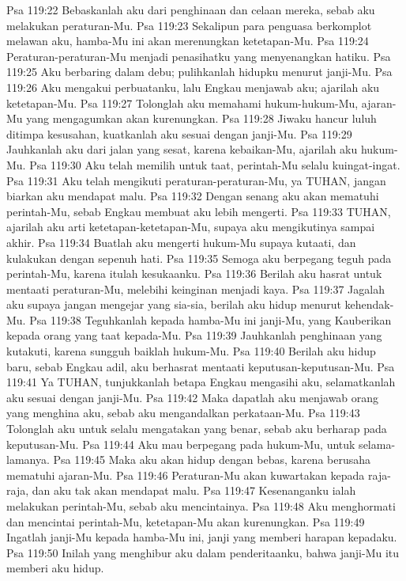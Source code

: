 Psa 119:22  Bebaskanlah aku dari penghinaan dan celaan mereka, sebab aku melakukan peraturan-Mu.
Psa 119:23  Sekalipun para penguasa berkomplot melawan aku, hamba-Mu ini akan merenungkan ketetapan-Mu.
Psa 119:24  Peraturan-peraturan-Mu menjadi penasihatku yang menyenangkan hatiku.
Psa 119:25  Aku berbaring dalam debu; pulihkanlah hidupku menurut janji-Mu.
Psa 119:26  Aku mengakui perbuatanku, lalu Engkau menjawab aku; ajarilah aku ketetapan-Mu.
Psa 119:27  Tolonglah aku memahami hukum-hukum-Mu, ajaran-Mu yang mengagumkan akan kurenungkan.
Psa 119:28  Jiwaku hancur luluh ditimpa kesusahan, kuatkanlah aku sesuai dengan janji-Mu.
Psa 119:29  Jauhkanlah aku dari jalan yang sesat, karena kebaikan-Mu, ajarilah aku hukum-Mu.
Psa 119:30  Aku telah memilih untuk taat, perintah-Mu selalu kuingat-ingat.
Psa 119:31  Aku telah mengikuti peraturan-peraturan-Mu, ya TUHAN, jangan biarkan aku mendapat malu.
Psa 119:32  Dengan senang aku akan mematuhi perintah-Mu, sebab Engkau membuat aku lebih mengerti.
Psa 119:33  TUHAN, ajarilah aku arti ketetapan-ketetapan-Mu, supaya aku mengikutinya sampai akhir.
Psa 119:34  Buatlah aku mengerti hukum-Mu supaya kutaati, dan kulakukan dengan sepenuh hati.
Psa 119:35  Semoga aku berpegang teguh pada perintah-Mu, karena itulah kesukaanku.
Psa 119:36  Berilah aku hasrat untuk mentaati peraturan-Mu, melebihi keinginan menjadi kaya.
Psa 119:37  Jagalah aku supaya jangan mengejar yang sia-sia, berilah aku hidup menurut kehendak-Mu.
Psa 119:38  Teguhkanlah kepada hamba-Mu ini janji-Mu, yang Kauberikan kepada orang yang taat kepada-Mu.
Psa 119:39  Jauhkanlah penghinaan yang kutakuti, karena sungguh baiklah hukum-Mu.
Psa 119:40  Berilah aku hidup baru, sebab Engkau adil, aku berhasrat mentaati keputusan-keputusan-Mu.
Psa 119:41  Ya TUHAN, tunjukkanlah betapa Engkau mengasihi aku, selamatkanlah aku sesuai dengan janji-Mu.
Psa 119:42  Maka dapatlah aku menjawab orang yang menghina aku, sebab aku mengandalkan perkataan-Mu.
Psa 119:43  Tolonglah aku untuk selalu mengatakan yang benar, sebab aku berharap pada keputusan-Mu.
Psa 119:44  Aku mau berpegang pada hukum-Mu, untuk selama-lamanya.
Psa 119:45  Maka aku akan hidup dengan bebas, karena berusaha mematuhi ajaran-Mu.
Psa 119:46  Peraturan-Mu akan kuwartakan kepada raja-raja, dan aku tak akan mendapat malu.
Psa 119:47  Kesenanganku ialah melakukan perintah-Mu, sebab aku mencintainya.
Psa 119:48  Aku menghormati dan mencintai perintah-Mu, ketetapan-Mu akan kurenungkan.
Psa 119:49  Ingatlah janji-Mu kepada hamba-Mu ini, janji yang memberi harapan kepadaku.
Psa 119:50  Inilah yang menghibur aku dalam penderitaanku, bahwa janji-Mu itu memberi aku hidup.
